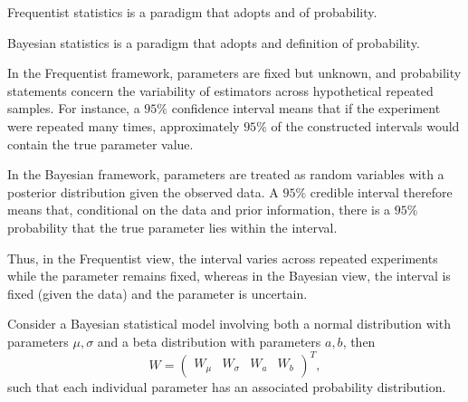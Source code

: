 \begin{definition}
	\label{def:frequentist_statistics}
	Frequentist statistics is a paradigm that adopts  and  of probability. 
\end{definition}

\begin{definition}
	\label{def:bayesian_statistics}
	Bayesian statistics is a paradigm that adopts  and definition  of probability. 
\end{definition}


\begin{remark}
	\label{rem:frequentist_statistics}
	In the Frequentist framework, parameters are fixed but unknown, and probability statements concern the variability of estimators across hypothetical repeated samples. For instance, a $95\%$ confidence interval means that if the experiment were repeated many times, approximately $95\%$ of the constructed intervals would contain the true parameter value. \newline
	
	In the Bayesian framework, parameters are treated as random variables with a posterior distribution given the observed data. A $95\%$ credible interval therefore means that, conditional on the data and prior information, there is a $95\%$ probability that the true parameter lies within the interval.\newline
	
	Thus, in the Frequentist view, the interval varies across repeated experiments while the parameter remains fixed, whereas in the Bayesian view, the interval is fixed (given the data) and the parameter is uncertain.
\end{remark}


\begin{example}
	Consider a Bayesian statistical model involving both a normal distribution with parameters $\mu,\sigma$ and a beta distribution with parameters $a,b$, then
\begin{equation}
	W = \begin{pmatrix}
		W_\mu & W_\sigma & W_a & W_b
		\end{pmatrix}^T,
\end{equation}
such that each individual parameter has an associated probability distribution.
\end{example}


